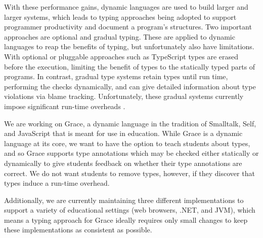 With these performance gains,
dynamic languages are used to build larger and larger systems,
which leads to typing approaches being adopted
to support programmer productivity and document a program's structures.
Two important approaches are optional\citep{GiladPluggable2004}
and gradual typing\citep{Siek2006,Siek2015}.
These are applied to dynamic languages to reap the benefits of typing, but
unfortunately also have limitations.
With optional or pluggable approaches such as 
TypeScript\citep{typeScriptECOOP,GiladPluggable2004}
%
types are erased before the execution,
limiting the benefit of types to the statically typed parts of programs.
In contrast, gradual type systems retain types until run time,
performing the checks dynamically, and
can give detailed information about type violations via blame 
tracking\citep{Siek2015,blame2009}.
Unfortunately, these gradual systems currently impose significant
run-time overheads
\citep{Takikawa2016,Vitousek2017,Muehlboeck2017,Bauman2017,Richards2017,Stulova2016,Greenman2018}.


We are working on Grace\citep{graceOnward12}, a dynamic language in
the tradition of Smalltalk\citep{bluebook}, Self\citep{Self}, and
JavaScript that is meant for use in
education\citep{graceSigcse13}.  While Grace is a dynamic language at
its core, we want to have the option to teach students about types,
and so Grace supports type annotations which may be checked either
statically or dynamically to give students feedback on whether their
type annotations are correct.  We do not want students to remove
types, however, if they discover that types induce a run-time
overhead.

Additionally, we are currently maintaining three different
implementations to support a variety of educational settings
(web browsers, .NET, and JVM),
which means a typing approach for Grace ideally requires
only small changes to keep these implementations as consistent as
possible.


